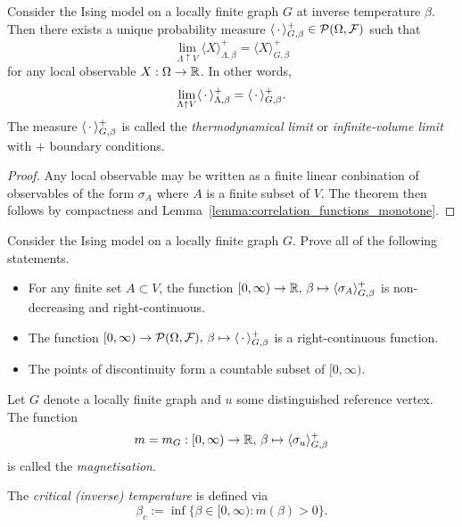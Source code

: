 \begin{theorem}
    Consider the Ising model on a locally finite graph $G$
    at inverse temperature $\beta$.
    Then there exists a unique probability measure
    $\langle\,\cdot\,\rangle_{G,\beta}^+\in\mathcal P(\Omega,\mathcal F)$
    such that
    \[
        \lim_{\Lambda\uparrow V}\langle X\rangle_{\Lambda,\beta}^+=\langle X\rangle_{G,\beta}^+
    \]
    for any local observable $X:\Omega\to\mathbb R$.
    In other words,
    \[
        \lim_{\Lambda\uparrow V}\langle \,\cdot\,\rangle_{\Lambda,\beta}^+
        =
        \langle \,\cdot\,\rangle_{G,\beta}^+.
    \]
    The measure $\langle\,\cdot\,\rangle_{G,\beta}^+$ is called
    the \emph{thermodynamical limit} or \emph{infinite-volume limit}
    with $+$ boundary conditions.
\end{theorem}

\begin{proof}
    Any local observable may be written as a finite linear conbination
    of observables of the form $\sigma_A$ where $A$ is a finite subset of
    $V$.
    The theorem then follows by compactness and Lemma~\ref{lemma:correlation_functions_monotone}.
\end{proof}

\begin{exercise}
    Consider the Ising model on a locally finite graph $G$.
    Prove all of the following statements.
    \begin{itemize}
        \item For any finite set $A\subset V$,
        the function $[0,\infty)\to\mathbb R,\,\beta\mapsto\langle\sigma_A\rangle_{G,\beta}^+$
        is non-decreasing and right-continuous.
        \item The function $[0,\infty)\to\mathcal P(\Omega,\mathcal F),\,\beta\mapsto\langle\,\cdot\,\rangle_{G,\beta}^+$
        is a right-continuous function.
        \item The points of discontinuity form a countable subset of $[0,\infty)$.
    \end{itemize}
\end{exercise}

\begin{definition}
    Let $G$ denote a locally finite graph and $u$ some distinguished reference vertex.
    The function
    \[
        m=m_G:[0,\infty)\to\mathbb R,\,\beta\mapsto\langle\sigma_u\rangle_{G,\beta}^+
    \]
    is called the \emph{magnetisation}.

    The \emph{critical (inverse) temperature} is defined via
    \[
        \beta_c:=\inf\{\beta\in[0,\infty):m(\beta)>0\}.
    \]
\end{definition}

